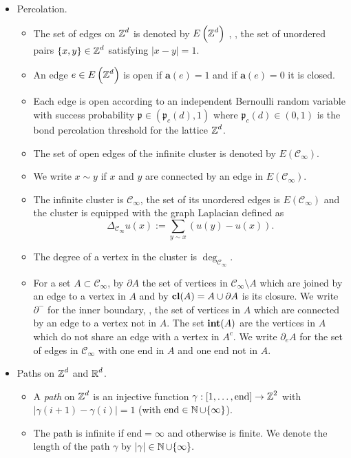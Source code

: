 \documentclass[12pt]{amsart}
\numberwithin{equation}{section}
\begin{document}
\begin{itemize}
		\item Percolation.
		\begin{itemize}
			\item The set of edges on $\operatorname{\mathbb{Z}}^d$ is denoted by $E\left( \operatorname{\mathbb{Z}}^d \right)$ , \ie, the set of unordered pairs $\{x,y\} \in \operatorname{\mathbb{Z}}^d$ satisfying $|x-y| =1$.
			\item An edge $e \in E\left( \operatorname{\mathbb{Z}}^d \right)$ is open if $\mathbf{a}(e) = 1$ and if $\mathbf{a}(e) = 0$ it is closed.
			\item Each edge is open according to an independent Bernoulli random variable with success probability 
			$\mathfrak{p} \in (\mathfrak{p}_c(d), 1)$ where $\mathfrak{p}_c(d) \in (0,1)$ is the bond percolation threshold for the lattice $\operatorname{\mathbb{Z}}^d$. 
			\item The set of open edges of the infinite cluster is denoted by $E \left( \mathscr{C}_\infty\right)$.
			\item We write $x \sim y$ if $x$ and $y$ are connected by an edge in $E \left( \mathscr{C}_\infty\right)$.
			\item The infinite cluster is $\mathscr{C}_{\infty}$, the set of its unordered edges is $E(\mathscr{C}_{\infty})$
			and the cluster is equipped with the graph Laplacian defined as 
			\[
			\Delta_{{\mathscr{C}_{\infty}}} u(x) := \sum_{y \sim x} (u(y) - u(x)). 
			\]
			\item The degree of a vertex in the cluster is $\deg_{\mathscr{C}_{\infty}}$.
			\item For a set $A \subset \mathscr{C}_{\infty}$, by $\partial A$ the set of vertices in $\mathscr{C}_{\infty} \setminus A$ which are joined by an edge to
			a vertex in $A$ and by $\mathbf{cl}(A) = A \cup \partial A$ is its closure.  We write $\partial^-$ for the inner boundary, \ie,  the set of vertices in $A$ which are connected by an edge to a vertex not in $A$. 
			The set $\operatorname{\mathbf{int}}(A)$ are the vertices in $A$ which do not share an edge with a vertex in $A^c$. 
			We write $\partial_e A$ for the set of edges in $\mathscr{C}_{\infty}$ with one end in $A$ and one end not in $A$. 
		\end{itemize}
		\item Paths on $\operatorname{\mathbb{Z}}^d$ and $\operatorname{\mathbb{R}}^d$.
		\begin{itemize}
			\item A {\it path} on $\operatorname{\mathbb{Z}}^d$ is an injective function $\gamma: [1, \ldots, \mathrm{end}] \to  \operatorname{\mathbb{Z}}^2$ with $|\gamma(i+1) - \gamma(i)| = 1$ (with $\mathrm{end} \in \operatorname{\mathbb{N}} \cup \{ \infty\}$). 
			\item The path is infinite if $\mathrm{end} = \infty$ and otherwise is finite. We denote the length of the path $\gamma $ by $\left| \gamma \right| \in \operatorname{\mathbb{N}} \cup \{ \infty \}.$

\end{itemize}
\end{itemize}
\end{document}
